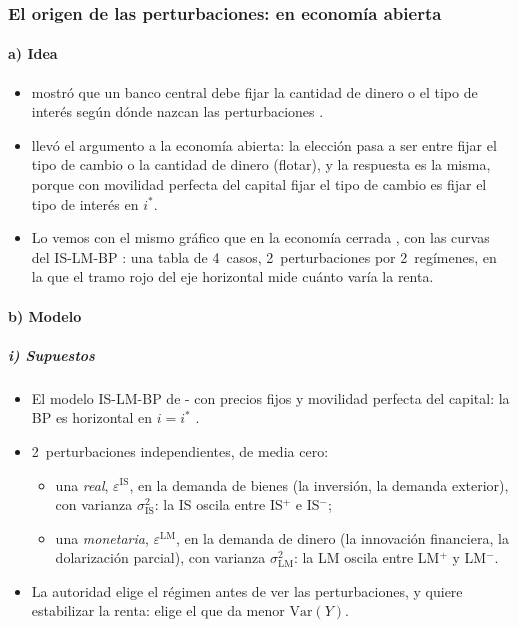 \documentclass[11pt]{article}
\begin{document}
\subsubsection{El origen de las perturbaciones:\cortetitulo {} en economía abierta}\label{sec:poole-abierta}

\paragraph{a) Idea}

\begin{itemize}
\item \textcite{Poole1970Optimal} mostró que un banco central debe fijar la cantidad de dinero o el tipo de interés según dónde nazcan las perturbaciones .
\item \textcite{Boyer1978Optimal} llevó el argumento a la economía abierta: la elección pasa a ser entre fijar el tipo de cambio o la cantidad de dinero (flotar), y la respuesta es la misma, porque con movilidad perfecta del capital fijar el tipo de cambio es fijar el tipo de interés en $i^*$.
\item Lo vemos con el mismo gráfico que en la economía cerrada , con las curvas del IS-LM-BP : una tabla de 4~casos, 2~perturbaciones por 2~regímenes, en la que el tramo rojo del eje horizontal mide cuánto varía la renta.
\end{itemize}

\paragraph{b) Modelo}

\subparagraph{i) Supuestos}

\begin{itemize}
\item El modelo IS-LM-BP de - con precios fijos y movilidad perfecta del capital: la BP es horizontal en $i=i^*$ .
\item 2~perturbaciones independientes, de media cero:
  \begin{itemize}
  \item una \emph{real}, $\varepsilon^{\mathrm{IS}}$, en la demanda de bienes (la inversión, la demanda exterior), con varianza $\sigma^2_{\mathrm{IS}}$: la IS oscila entre IS$^+$ e IS$^-$;
  \item una \emph{monetaria}, $\varepsilon^{\mathrm{LM}}$, en la demanda de dinero (la innovación financiera, la dolarización parcial), con varianza $\sigma^2_{\mathrm{LM}}$: la LM oscila entre LM$^+$ y LM$^-$.
  \end{itemize}
\item La autoridad elige el régimen antes de ver las perturbaciones, y quiere estabilizar la renta: elige el que da menor $\mathrm{Var}(Y)$.
\end{itemize}
\end{document}
